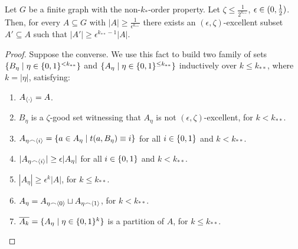         \begin{lemma} \label{lem:existance_of_excellent_subsets}
            Let $G$ be a finite graph with the non-$k_{*}$-order property.
            Let $\zeta \leq \frac{1}{2^{k_{**}}}$, $\epsilon \in ( 0, \frac{1}{2} )$.
            Then, for every $A \subseteq G$ with $|A| \geq \frac{1}{\epsilon^{k_{**}}}$ there exists an $(\epsilon, \zeta)$-excellent
            subset $A' \subseteq A$ such that $|A'| \geq \epsilon^{k_{**}-1} |A|$.
            \begin{proof}
                Suppose the converse.
                We use this fact to build two family of sets $\{ B_\eta \mid \eta \in \{ 0,1 \}^{<k_{**}} \}$ and
                $\{ A_\eta \mid \eta \in \{ 0,1 \}^{\leq k_{**}} \}$ inductively over $k\leq k_{**}$, where $k = |\eta|$,
                satisfying:
                \begin{enumerate}[label={\Roman*}., ref={\Roman*}, font=\rmfamily]
                    \item\label{itm:existance_of_excellent_subsets.1} $A_{\left< \cdot \right>} = A$.
                    \item\label{itm:existance_of_excellent_subsets.2} $B_\eta$ is a $\zeta$-good set witnessing that $A_\eta$ is not
                        $(\epsilon, \zeta)$-excellent, for $k < k_{**}$.
                    \item\label{itm:existance_of_excellent_subsets.3} $A_{\eta \frown \left< i \right>} = \{ a \in A_\eta \mid t(a, B_\eta) \equiv i \}$
                        for all $i \in \{ 0,1 \}$ and $k < k_{**}$.
                    \item\label{itm:existance_of_excellent_subsets.4} $| A_{\eta \frown \left< i \right>} | \geq \epsilon |A_\eta|$
                        for all $i \in \{ 0,1 \}$ and $k < k_{**}$.
                    \item\label{itm:existance_of_excellent_subsets.5} $|A_\eta| \geq \epsilon^k |A|$, for $k \leq k_{**}$.
                    \item\label{itm:existance_of_excellent_subsets.6} $A_\eta = A_{\eta \frown \left< 0 \right>} \sqcup A_{\eta \frown \left< 1 \right>}$,
                        for $k < k_{**}$.
                    \item\label{itm:existance_of_excellent_subsets.7} $\overline{A_k} = \{ A_\eta \mid \eta \in \{ 0,1 \}^k \}$ is a partition of $A$,
                        for $k \leq k_{**}$.

\end{enumerate}
\end{proof}
\end{lemma}
